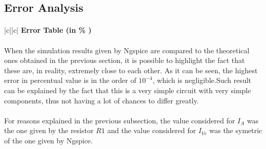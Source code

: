 \subsection{Error Analysis}



\paragraph{}
\begin{center}
\begin{tabular}{|c||c|}
      \hline    
       {\bf Error Table (in \% )} \\
      \hline

	
     
      \end{tabular}
\end{center}

\paragraph{} When the simulation results given by Ngspice are compared to the theoretical ones obtained in the previous section, it is possible to highlight the fact that these are, in reality, extremely close to each other. As it can be seen, the highest error in percentual value is in the order of $10^{-4}$, which is negligible.Such result can be explained by the fact that this is a very simple circuit with very simple components, thus not having a lot of chances to differ greatly.

\paragraph{}For reasons explained in the previous subsection, the value considered for $I_A$ was the one given by the resistor $R1$ and the value considered for $I_{Vc}$ was the symetric of the one given by Ngspice.

